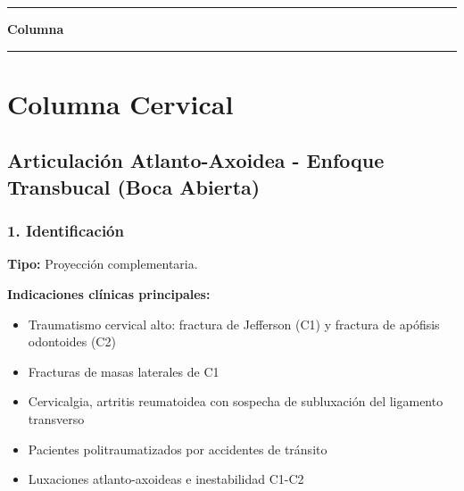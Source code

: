 \clearpage
\onecolumn
\thispagestyle{empty}
\vspace*{\fill}
\begin{center}
	{\color{radblue}\rule{\linewidth}{2pt}}\par
	\vspace{6mm}
	{\Huge\bfseries\color{radblue}Columna}\par
	\vspace{6mm}
	{\color{radblue}\rule{\linewidth}{2pt}}
\end{center}
\vspace*{\fill}
\clearpage
\twocolumn
\pagestyle{contenido}



	
	\section{Columna Cervical}
	
	\subsection{Articulación Atlanto-Axoidea - Enfoque Transbucal (Boca Abierta)}
	
	\subsubsection*{1. Identificación}
	
	\textbf{Tipo:} Proyección complementaria.
	
	\textbf{Indicaciones clínicas principales:}
	\begin{itemize}
		\item Traumatismo cervical alto: fractura de Jefferson (C1) y fractura de apófisis odontoides (C2)
		\item Fracturas de masas laterales de C1
		\item Cervicalgia, artritis reumatoidea con sospecha de subluxación del ligamento transverso
		\item Pacientes politraumatizados por accidentes de tránsito
		\item Luxaciones atlanto-axoideas e inestabilidad C1-C2
	\end{itemize}
	
